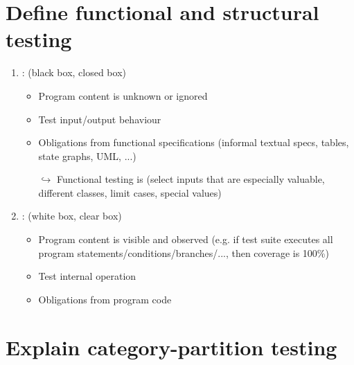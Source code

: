\section{Define functional and structural testing}

\begin{enumerate}
    \item {} : (black box, closed box)
    \begin{itemize}
        \item Program content is unknown or ignored
        \item Test input/output behaviour
        \item Obligations from functional specifications (informal textual specs, tables, state graphs, UML, ...)
        \item [$\hookrightarrow$] Functional testing is  (select inputs that are especially valuable, different classes, limit cases, special values)
    \end{itemize}
    \item {} : (white box, clear box)
    \begin{itemize}
         \item Program content is visible and observed (e.g. if test suite executes all program statements/conditions/branches/..., then coverage is 100\%)
         \item Test internal operation
         \item Obligations from program code
     \end{itemize}
\end{enumerate}

\newpage
\section{Explain category-partition testing}

